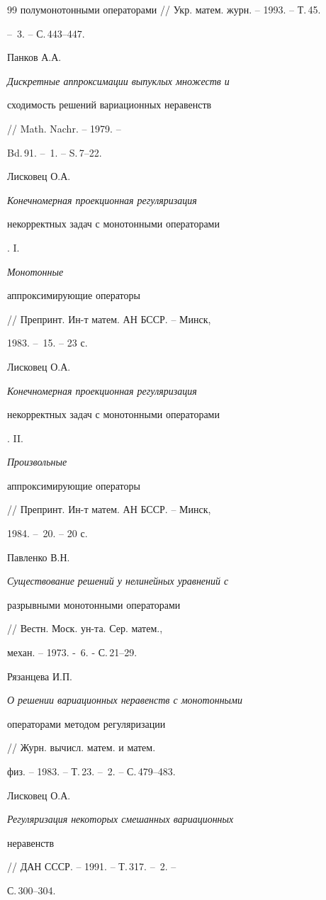 \begin{thebibliography}{99}
{полумонотонными операторами} // Укр. матем. журн. -- 1993. -- Т.\,45. 


-- \No\,3. -- С.\,443--447. 




Панков А.А. {\em Дискретные аппроксимации выпуклых множеств и 


сходимость решений вариационных неравенств} // Math. Nachr. -- 1979. -- 


Bd.\,91. -- \No\,1. -- S.\,7--22. 




Лисковец О.А. {\em Конечномерная проекционная регуляризация 


некорректных задач с монотонными операторами}. I. {\em Монотонные 


аппроксимирующие операторы} // Препринт. Ин-т матем. АН БССР. -- Минск, 


1983. -- \No\,15. -- 23 с. 




Лисковец О.А. {\em Конечномерная проекционная регуляризация 


некорректных задач с монотонными операторами}. II. {\em Произвольные


аппроксимирующие операторы} // Препринт. Ин-т матем. АН БССР. -- Минск, 


1984. -- \No\,20. -- 20 с. 




Павленко В.Н. {\em Существование решений у нелинейных уравнений с 


разрывными монотонными операторами} // Вестн. Моск. ун-та. Сер. матем., 


механ. -- 1973. - \No\,6. - С.\,21--29. 




Рязанцева И.П. {\em О решении вариационных неравенств с монотонными 


операторами методом регуляризации} // Журн. вычисл. матем. и матем. 


физ. -- 1983. -- Т.\,23. -- \No\,2. -- С.\,479--483. 




Лисковец О.А. {\em Регуляризация некоторых смешанных вариационных 


неравенств} // ДАН СССР. -- 1991. -- Т.\,317. -- \No\,2. -- 


С.\,300--304. 


 


 


\end{thebibliography} 


 


\vskip 2cm 


 








 


\label{end} 


 



